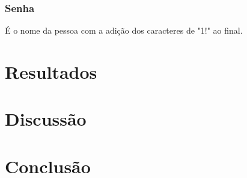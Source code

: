 \documentclass[conference,compsoc]{IEEEtran}
\begin{document}
\subsubsection{Senha}
É o nome da pessoa com a adição dos caracteres de "1!" ao final.


\section{Resultados}

\section{Discussão}

\section{Conclusão}
\end{document}
